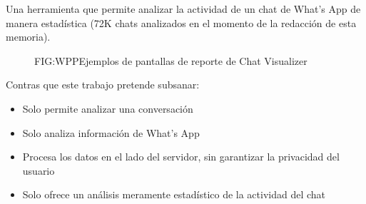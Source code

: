 Una herramienta que permite analizar la actividad de un chat de What's App de manera estadística (72K chats analizados en el momento de la redacción de esta memoria).

\begin{figure}[Chat Visualizer]{FIG:WPP}{Ejemplos de pantallas de reporte de Chat Visualizer}
\end{figure}

Contras que este trabajo pretende subsanar:
\begin{itemize}
    \item Solo permite analizar una conversación
    \item Solo analiza información de What's App
    \item Procesa los datos en el lado del servidor, sin garantizar la privacidad del usuario
    \item Solo ofrece un análisis meramente estadístico de la actividad del chat
\end{itemize}

\newpage
